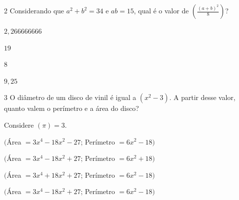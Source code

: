 \num{2} Considerando que $a^2+ b^2 = 34$ e $ab= 15$, qual é o valor de
$(\frac{(a + b)^2}{8})$?

\begin{boxlist}
\item $2,266666666$
\item $19$
\item  $8$ 
\item $9,25$
\end{boxlist}










\num{3} O diâmetro de um disco de vinil é igual a $(x^2 - 3)$. A partir desse
valor, quanto valem o perímetro e a área do disco?

Considere $(\pi) = 3$.

\begin{escolha}
\item $($Área $= 3x^4 - 18x^2 - 27$; Perímetro $= 6x^2 - 18)$
\item $($Área $= 3x^4 - 18x^2 + 27$; Perímetro $= 6x^2 + 18)$
\item $($Área $= 3x^4 + 18x^2 + 27$; Perímetro $= 6x^2 - 18)$
\item  $($Área $= 3x^4 - 18x^2 + 27$; Perímetro $= 6x^2 - 18)$ 
\end{escolha}



